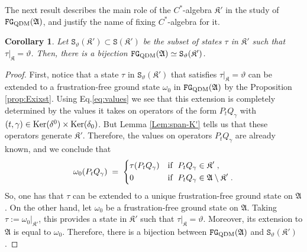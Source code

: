\documentclass[a4paper,12pt,twoside,reqno]{amsart}
\theoremstyle{plain}
\newtheorem{cor}[teo]{Corollary}
\theoremstyle{definition}
\theoremstyle{remark}
\numberwithin{equation}{section}
\numberwithin{figure}{section}
\numberwithin{table}{section}
\begin{document}
	
	The next result describes the main role of the $C^*$-algebra 
	$\mathfrak{K}'$ in the study of $\mathtt{FG}_{\rm QDM}(\mathfrak{A})$,
	and justify the name of {fixing} $C^*$-algebra for it.
	\begin{cor}\label{cor_uni_ext}
		Let $\mathtt{S}_{\vartheta}(\mathfrak{K}')\subset \mathtt{S}(\mathfrak{K}')$ be the subset of states $\tau$ in $\mathfrak{K}'$ such that $\tau|_{\mathfrak{K}}=\vartheta$. Then, there is a bijection
		$ \mathtt{FG}_{\rm QDM}(\mathfrak{A})\simeq\mathtt{S}_{\vartheta}(\mathfrak{K}')$.
	\end{cor}
	\begin{proof}
		First, notice that a state $\tau$ in $\mathtt{S}_{\vartheta}(\mathfrak{K}')$ that satisfies $\tau|_{\mathfrak{K}}=\vartheta$ can be extended to a frustration-free ground state $\omega_0$ in $\mathtt{FG}_{\rm QDM}(\mathfrak{A})$ by the Proposition \ref{prop:Exixst}. Using Eq.\eqref{eq:values} we see that this extension is completely determined by the values it takes on operators of the form $P_tQ_\gamma$ with $(t,\gamma)\in {\rm Ker}(\delta^0)\times {\rm Ker}(\delta_0)$. But Lemma \ref{Lem:span-K'} tells us that these operators generate $\mathfrak{K}'$. Therefore, the values on operators $P_tQ_\gamma$ are already known, and we conclude that
		\begin{equation}\label{eq:extension}
			\omega_0(P_tQ_\gamma)\;=\;
			\left\{
			\begin{aligned}
				&\tau(P_tQ_\gamma)&&{\rm if}\;\;P_tQ_\gamma\in \mathfrak{K}'\;,\\
				&0&&{\rm if}\;\;P_tQ_\gamma\in \mathfrak{A}\setminus\mathfrak{K}'\;.
			\end{aligned}
			\right.
		\end{equation}
		So, one has that $\tau$ can be extended to a unique frustration-free ground state on $\mathfrak{A}$.
		On the other hand, let $\omega_0$ be a frustration-free ground state on $\mathfrak{A}$. Taking $\tau:=\omega_0|_{\mathfrak{K}'}$, this provides a state in $\mathfrak{K}'$ such that $\tau|_{\mathfrak{K}}=\vartheta$. Moreover, its extension to $\mathfrak{A}$ is equal to $\omega_0$.
		Therefore, there is a bijection between $\mathtt{FG}_{\rm QDM}(\mathfrak{A})$ and $\mathtt{S}_{\vartheta}(\mathfrak{K}')$.
	\end{proof}
	
	
	
	
	
	
\end{document}
